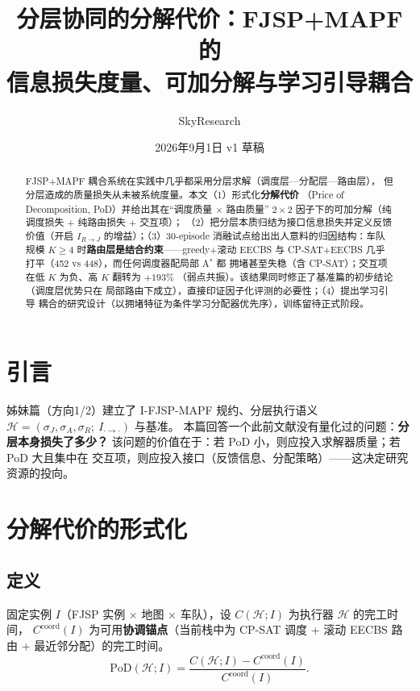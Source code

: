 \documentclass[UTF8,12pt,a4paper]{ctexart}
\title{分层协同的分解代价：FJSP+MAPF 的\\信息损失度量、可加分解与学习引导耦合}
\author{SkyResearch}
\date{2026年9月1日 \quad v1 草稿}
\begin{document}
\maketitle

\begin{abstract}
FJSP+MAPF 耦合系统在实践中几乎都采用分层求解（调度层—分配层—路由层），
但分层造成的质量损失从未被系统度量。本文（1）形式化\textbf{分解代价}
（Price of Decomposition, PoD）并给出其在``调度质量 $\times$ 路由质量''
$2\times2$ 因子下的可加分解（纯调度损失 + 纯路由损失 + 交互项）；
（2）把分层本质归结为接口信息损失并定义反馈价值（开启 $I_{R\to J}$
的增益）；（3）30-episode 消融试点给出出人意料的归因结构：车队规模
$K\ge4$ 时\textbf{路由层是结合约束}——greedy+滚动 EECBS 与
CP-SAT+EECBS 几乎打平（452 vs 448），而任何调度器配局部 A$^*$ 都
拥堵甚至失稳（含 CP-SAT）；交互项在低 $K$ 为负、高 $K$ 翻转为 $+193\%$
（弱点共振）。该结果同时修正了基准篇的初步结论（调度层优势只在
局部路由下成立），直接印证因子化评测的必要性；（4）提出学习引导
耦合的研究设计（以拥堵特征为条件学习分配器优先序），训练留待正式阶段。
\end{abstract}

\section{引言}

姊妹篇（方向1/2）建立了 I-FJSP-MAPF 规约、分层执行语义
$\mathcal{H}=(\sigma_J,\sigma_A,\sigma_R;\ I_{\cdot\to\cdot})$ 与基准。
本篇回答一个此前文献没有量化过的问题：\textbf{分层本身损失了多少？}
该问题的价值在于：若 PoD 小，则应投入求解器质量；若 PoD 大且集中在
交互项，则应投入接口（反馈信息、分配策略）——这决定研究资源的投向。

\section{分解代价的形式化}\label{sec:pod}

\subsection{定义}

固定实例 $I$（FJSP 实例 $\times$ 地图 $\times$ 车队），设
$C(\mathcal{H};I)$ 为执行器 $\mathcal{H}$ 的完工时间，
$C^{\mathrm{coord}}(I)$ 为可用\textbf{协调锚点}（当前栈中为
CP-SAT 调度 + 滚动 EECBS 路由 + 最近邻分配）的完工时间。
\begin{equation}
\mathrm{PoD}(\mathcal{H};I) = \frac{C(\mathcal{H};I) - C^{\mathrm{coord}}(I)}
{C^{\mathrm{coord}}(I)}.
\end{equation}
\end{document}
